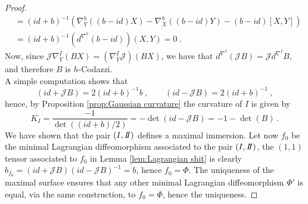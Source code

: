 \begin{proof}
\[\begin{split}
        & = (id + b)^{-1} (\nabla^h_Y ((b-id) X) -  \nabla^h_X ((b-id) Y) - (b-id) \left[ X,Y \right] ) \\
        & = (id + b)^{-1}(d^{\nabla^h}(b-id))(X,Y) = 0 \ .
    \end{split}
    \]
    Now, since $\mathcal{J}\nabla^I_Y(BX) = (\nabla^I_Y \mathcal{J})(BX)$, we have that $d^{\nabla^I} (\mathcal{J}B) = \mathcal{J} d^{\nabla^I} B$, and therefore $B$ is $h$-Codazzi.\\
    A simple computation shows that 
    \begin{equation}\label{eq:roba}
        (id+ \mathcal{J}B) = 2(id +b)^{-1} b  \ , \qquad (id- \mathcal{J}B) = 2(id +b)^{-1} \ ,
    \end{equation}
     hence, by Proposition \ref{prop:Gaussian curvature} the curvature of $I$ is given by
    \[
        K_I = \frac{-1}{\det((id+b)/2)} = -\det(id - \mathcal{J}B) = -1 - \det(B) \ .
    \]
    We have shown that the pair $(\I,\II)$ defines a maximal immersion.
    Let now $f_0$ be the minimal Lagrangian diffeomorphism associated to the pair $(I,\II)$, the $(1,1)$ tensor associated to $f_0$ in Lemma \ref{lem:Lagrangian shit} is clearly $b_{f_0} = (id+\mathcal{J}B)(id-\mathcal{J}B)^{-1} = b$, hence $f_0 = \Phi$. The uniqueness of the maximal surface ensures that any other minimal Lagrangian diffeomorphism $\Phi'$ is equal, via the same construction, to $f_0=\Phi$, hence the uniqueness.
\end{proof}
